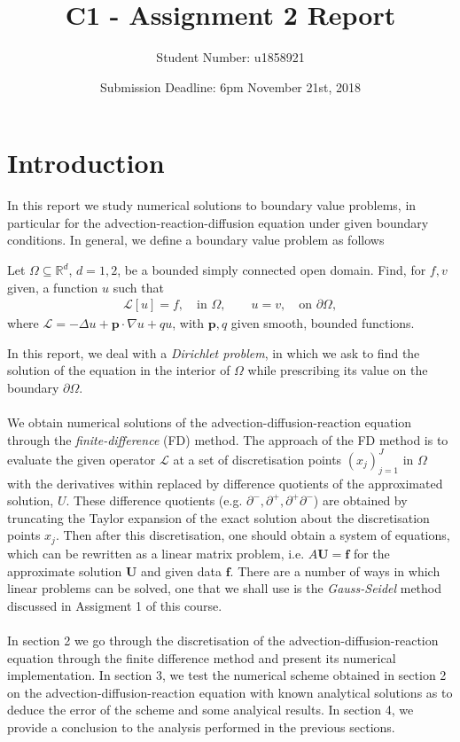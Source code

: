 \documentclass[a4paper,11pt]{article}
\title{C1 - Assignment 2 Report}
\author{Student Number: u1858921}
\date{Submission Deadline: 6pm November 21st, 2018}
\theoremstyle{break}
\theoremstyle{break2}
\theoremstyle{break}
\theoremstyle{break2}
\newcommand{\R}{\mathbb{R}}
\newcommand{\cL}{\mathcal{L}}
\begin{document}
	\maketitle
	\tableofcontents
	
\section{Introduction}
In this report we study numerical solutions to boundary value problems, in particular for the advection-reaction-diffusion equation under given boundary conditions. In general, we define a boundary value problem as follows
\begin{mdframed}[]
	Let $ \Omega \subseteq \R^d $, $ d = 1,2 $, be a bounded simply connected open domain. Find, for $ f,v $ given, a function $ u $ such that
	\begin{align*}
	\cL[u] = f, \quad \text{in } \Omega,\qquad u = v,  \quad \text{on } \partial\Omega,
	\end{align*}
	where $ \cL = -\Delta u + \mathbf{p}\cdot\nabla u + qu $, with $ \mathbf{p},q $ given smooth, bounded functions.
\end{mdframed}
In this report, we deal with a \emph{Dirichlet problem}, in which we ask to find the solution of the equation in the interior of $ \Omega $ while prescribing its value on the boundary $ \partial\Omega $.\\\\
We obtain numerical solutions of the advection-diffusion-reaction equation through the \emph{finite-difference} (FD) method. The approach of the FD method is to evaluate the given operator $ \cL $ at a set of discretisation points $ (x_j)_{j=1}^J $ in $ \Omega $ with the derivatives within replaced by difference quotients of the approximated solution, $ U $. These difference quotients (e.g. $ \partial^-, \partial^+, \partial^+\partial^- $) are obtained by truncating the Taylor expansion of the exact solution about the discretisation points $ x_j $. Then after this discretisation, one should obtain a system of equations, which can be rewritten as a linear matrix problem, i.e. $ A\mathbf{U}=\mathbf{f} $ for the approximate solution $ \mathbf{U} $ and given data $ \mathbf{f} $. There are a number of ways in which linear problems can be solved, one that we shall use is the \emph{Gauss-Seidel} method discussed in Assigment 1 of this course.\\\\
In section 2 we go through the discretisation of the advection-diffusion-reaction equation through the finite difference method and present its numerical implementation. In section 3, we test the numerical scheme obtained in section 2 on the advection-diffusion-reaction equation with known analytical solutions as to deduce the error of the scheme and some analyical results. In section 4, we provide a conclusion to the analysis performed in the previous sections.
\end{document}
